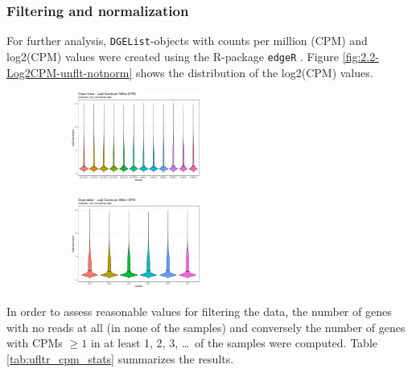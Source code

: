 \subsubsection{Filtering and normalization}

For further analysis, \verb|DGEList|-objects with counts per million (CPM) and log2(CPM) values were created using the R-package \verb|edgeR| \autocite{R-edgeR, edgeR2010}. Figure \ref{fig:2.2-Log2CPM-unflt-notnorm} shows the distribution of the log2(CPM) values.

\begin{figure}[htbp]
    \caption{Log2(CPM) distribution of the unfiltered, non-normalized data}
    \label{fig:2.2-Log2CPM-unflt-notnorm}
    \begin{subfigure}[t]{0.64\linewidth}
        \caption{}
        \label{fig:2.2-Log2CPM-unflt-notnorm-Oryza_nivara}
        \includegraphics[width=\textwidth, height=3cm]{../../results/plots-and-tables/2.2-Log2CPM-unflt-notnorm-Oryza_nivara}
    \end{subfigure}
    \begin{subfigure}[t]{0.32\linewidth}
        \caption{}
        \label{fig:2.2-Log2CPM-unflt-notnorm-Oryza_sativa}
        \includegraphics[width=\textwidth, height=3cm]{../../results/plots-and-tables/2.2-Log2CPM-unflt-notnorm-Oryza_sativa}
    \end{subfigure}
\end{figure}

In order to assess reasonable values for filtering the data, the number of genes with no reads at all (in none of the samples) and conversely the number of genes with CPMs \(\ge 1\) in at least 1, 2, 3, \dots\ of the samples were computed. Table \ref{tab:ufltr_cpm_stats} summarizes the results.

